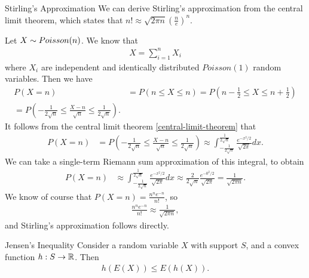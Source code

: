\begin{exmp}{Stirling's Approximation}\proofbreak
    We can derive Stirling's approximation from the central limit theorem, which states that $n! \approx \sqrt{2\pi n}\left(\frac{n}{e}\right)^n$.

    Let $X \sim Poisson(n)$. We know that
    \begin{align*}
        X = \sum_{i=1}^{n}X_i
    \end{align*}
    where $X_i$ are independent and identically distributed $Poisson(1)$ random variables. Then we have
    \begin{align*}
        P(X = n) &= P(n \leq X \leq n) = P\left(n-\frac{1}{2} \leq X \leq n + \frac{1}{2}\right) \\
        = P\left(-\frac{1}{2\sqrt{n}} \leq \frac{X-n}{\sqrt{n}} \leq \frac{1}{2\sqrt{n}}\right).
    \end{align*}
    It follows from the central limit theorem \ref{central-limit-theorem} that
    \begin{align*}
        P(X = n) &= P\left(-\frac{1}{2\sqrt{n}} \leq \frac{X-n}{\sqrt{n}} \leq \frac{1}{2\sqrt{n}}\right) \approx \int_{-\frac{1}{2\sqrt{n}}}^{\frac{1}{2\sqrt{n}}}\frac{e^{-x^2/2}}{\sqrt{2\pi}}dx.
    \end{align*}
    We can take a single-term Riemann sum approximation of this integral, to obtain
    \begin{align*}
        P(X = n) &\approx \int_{-\frac{1}{2\sqrt{n}}}^{\frac{1}{2\sqrt{n}}}\frac{e^{-x^2/2}}{\sqrt{2\pi}}dx \approx \frac{2}{2\sqrt{n}}\frac{e^{-0^2/2}}{\sqrt{2\pi}} = \frac{1}{\sqrt{2\pi n}}.
    \end{align*}
    We know of course that $P(X = n) = \frac{{n^n}e^{-n}}{n!}$, so
    \begin{align*}
        \frac{{n^n}e^{-n}}{n!} \approx \frac{1}{\sqrt{2\pi n}},
    \end{align*}
    and Stirling's approximation follows directly.
\end{exmp}

\begin{prop}{Jensen's Inequality}\label{jensen-inequality}\proofbreak
    Consider a random variable $X$ with support $S$, and a convex function $h: S \to \mathbb{R}$. Then
    \begin{align*}
        h\left(E(X)\right) \leq E\left(h(X)\right).
    \end{align*}
\end{prop}

